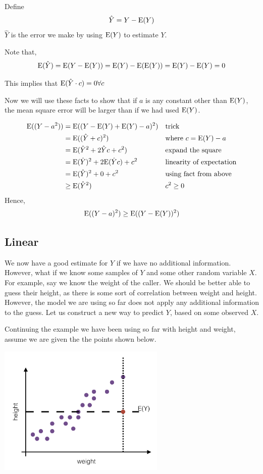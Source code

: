 \documentclass{exam}
\begin{document}
Define 
\[\hat{Y} = Y - \text{E}(Y)\]
$\hat{Y}$ is the error we make by using $\text{E}(Y)$ to estimate $Y$.

Note that,
\[\text{E}(\hat{Y}) = \text{E}(Y - \text{E}(Y)) = \text{E}(Y) - \text{E}(\text{E}(Y)) = \text{E}(Y) - \text{E}(Y) = 0\]

This implies that $\text{E}(\hat{Y}\cdot c) = 0  \forall c$

Now we will use these facts to show that if $a$ is any constant other than $\text{E}(Y)$, the mean square error will be larger than if we had used $\text{E}(Y)$.

\begin{align*}
\text{E}((Y - a^2)) &= \text{E}((Y - \text{E}(Y) + \text{E}(Y) - a)^2) && \text{trick}\\
&= \text{E}((\hat{Y} + c)^2) && \text{where $c = \text{E}(Y) - a$}\\
&= \text{E}(\hat{Y}^2 + 2\hat{Y}c + c^2) && \text{expand the square}\\
&= \text{E}(\hat{Y})^2 + 2\text{E}(\hat{Y}c) + c^2 && \text{linearity of expectation}\\
&= \text{E}(\hat{Y})^2 + 0 + c^2 && \text{using fact from above}\\
&\geq \text{E}(\hat{Y}^2) && \text{$c^2 \geq 0$}
\end{align*}
Hence, 
\[\text{E}((Y - a)^2) \geq \text{E}((Y - \text{E}(Y))^2)\]

\clearpage

\subsection{Linear}
We now have a good estimate for $Y$ if we have no additional information. However, what if we know some samples of $Y$ and some other random variable $X$. For example, say we know the weight of the caller. We should be better able to guess their height, as there is some sort of correlation between weight and height. However, the model we are using so far does not apply any additional information to the guess.  Let us construct a new way to predict $Y$, based on some observed $X$.

Continuing the example we have been using so far with height and weight, assume we are given the the points shown below. 

\begin{center}
\includegraphics[width=8cm]{llse_linear.jpg}
\end{center}
\end{document}
